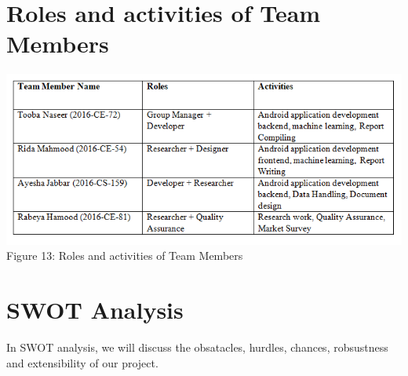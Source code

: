 \documentclass{article}
\begin{document}
\section{Roles and activities of Team Members}
\begin{center}
\includegraphics[scale=0.8]{table5}
\\Figure 13: Roles and activities of Team Members
\end{center}
\section{SWOT Analysis}

In SWOT analysis, we will discuss the obsatacles, hurdles, chances, robsustness and extensibility of our project.
\end{document}
